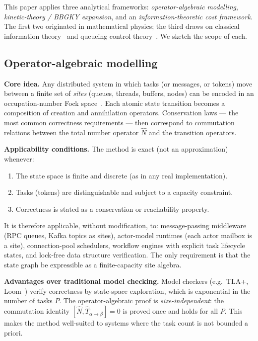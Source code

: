 \documentclass[11pt,a4paper]{report}
\begin{document}
This paper applies three analytical frameworks: \emph{operator-algebraic
modelling}, \emph{kinetic-theory / BBGKY expansion}, and an
\emph{information-theoretic cost framework}.  The first two originated in
mathematical physics; the third draws on classical information
theory~\cite{shannon1948,cover_thomas2006} and queueing control
theory~\cite{stidham1985,weber1990}.  We sketch the scope of each.

\subsection{Operator-algebraic modelling}

\medskip
\noindent\textbf{Core idea.}
Any distributed system in which tasks (or messages, or tokens) move
between a finite set of \emph{sites} (queues, threads, buffers, nodes)
can be encoded in an occupation-number Fock space~\cite{fock1932}.
Each atomic state transition becomes a composition of creation and
annihilation operators.  Conservation laws --- the most common
correctness requirements --- then correspond to commutation relations
between the total number operator $\hat{N}$ and the transition
operators.

\medskip
\noindent\textbf{Applicability conditions.}
The method is exact (not an approximation) whenever:
\begin{enumerate}
  \item The state space is finite and discrete (as in any real implementation).
  \item Tasks (tokens) are distinguishable and subject to a capacity constraint.
  \item Correctness is stated as a conservation or reachability property.
\end{enumerate}
It is therefore applicable, without modification, to: message-passing
middleware (RPC queues, Kafka topics as sites), actor-model runtimes
(each actor mailbox is a site), connection-pool schedulers, workflow
engines with explicit task lifecycle states, and lock-free data structure
verification.  The only requirement is that the state graph be expressible
as a finite-capacity site algebra.

\medskip
\noindent\textbf{Advantages over traditional model checking.}
Model checkers (e.g.\ TLA+, Loom~\cite{loom2023}) verify correctness by state-space
exploration, which is exponential in the number of tasks $P$.
The operator-algebraic proof is \emph{size-independent}: the commutation
identity $[\hat{N}, \hat{T}_{\alpha\to\beta}] = 0$ is proved once and holds
for all $P$.  This makes the method well-suited to systems where the task
count is not bounded a priori.
\end{document}
